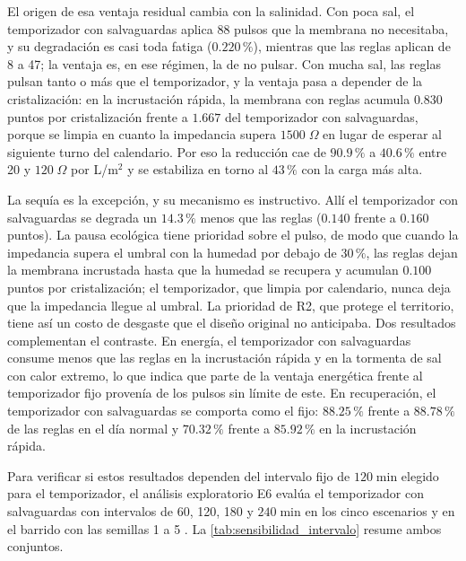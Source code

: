 El origen de esa ventaja residual cambia con la salinidad. Con poca sal, el temporizador con salvaguardas aplica 88 pulsos que la membrana no necesitaba, y su degradaci\'on es casi toda fatiga ($0.220\,\%$), mientras que las reglas aplican de 8 a 47; la ventaja es, en ese r\'egimen, la de no pulsar. Con mucha sal, las reglas pulsan tanto o m\'as que el temporizador, y la ventaja pasa a depender de la cristalizaci\'on: en la incrustaci\'on r\'apida, la membrana con reglas acumula $0.830$ puntos por cristalizaci\'on frente a $1.667$ del temporizador con salvaguardas, porque se limpia en cuanto la impedancia supera $1500\;\Omega$ en lugar de esperar al siguiente turno del calendario. Por eso la reducci\'on cae de $90.9\,\%$ a $40.6\,\%$ entre 20 y $120\;\Omega$ por L/m$^2$ y se estabiliza en torno al $43\,\%$ con la carga m\'as alta.

La sequ\'ia es la excepci\'on, y su mecanismo es instructivo. All\'i el temporizador con salvaguardas se degrada un $14.3\,\%$ menos que las reglas ($0.140$ frente a $0.160$ puntos). La pausa ecol\'ogica tiene prioridad sobre el pulso, de modo que cuando la impedancia supera el umbral con la humedad por debajo de $30\,\%$, las reglas dejan la membrana incrustada hasta que la humedad se recupera y acumulan $0.100$ puntos por cristalizaci\'on; el temporizador, que limpia por calendario, nunca deja que la impedancia llegue al umbral. La prioridad de R2, que protege el territorio, tiene as\'i un costo de desgaste que el dise\~no original no anticipaba. Dos resultados complementan el contraste. En energ\'ia, el temporizador con salvaguardas consume menos que las reglas en la incrustaci\'on r\'apida y en la tormenta de sal con calor extremo, lo que indica que parte de la ventaja energ\'etica frente al temporizador fijo proven\'ia de los pulsos sin l\'imite de este. En recuperaci\'on, el temporizador con salvaguardas se comporta como el fijo: $88.25\,\%$ frente a $88.78\,\%$ de las reglas en el d\'ia normal y $70.32\,\%$ frente a $85.92\,\%$ en la incrustaci\'on r\'apida.

Para verificar si estos resultados dependen del intervalo fijo de $120\;\text{min}$ elegido para el temporizador, el an\'alisis exploratorio E6 eval\'ua el temporizador con salvaguardas con intervalos de 60, 120, 180 y $240\;\text{min}$ en los cinco escenarios y en el barrido con las semillas 1 a 5 \parencite[doc.~04, \S~8.14]{axioma2026engine}. La \cref{tab:sensibilidad_intervalo} resume ambos conjuntos.

